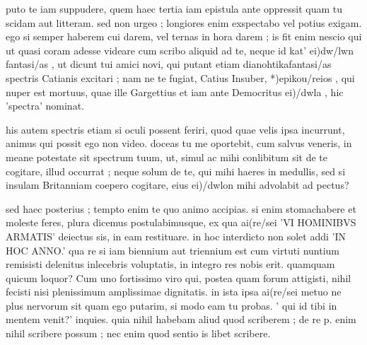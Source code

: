 


 puto te iam suppudere, quem haec tertia iam epistula ante oppressit quam tu scidam aut litteram. sed non urgeo ; longiores enim exspectabo vel potius exigam. ego si semper haberem cui darem, vel ternas in hora darem ; is fit enim nescio qui ut quasi coram adesse videare cum scribo aliquid ad te, neque id kat' ei)dw/lwn fantasi/as , ut dicunt tui amici novi, qui putant etiam dianohtika\s fantasi/as spectris Catianis excitari ; nam ne te fugiat, Catius Insuber, *)epikou/reios , qui nuper est mortuus, quae ille Gargettius et iam ante Democritus ei)/dwla , hic 'spectra' nominat.

 his autem spectris etiam si oculi possent feriri, quod quae velis ipsa incurrunt, animus qui possit ego non video. doceas tu me oportebit, cum salvus veneris, in meane potestate sit spectrum tuum, ut, simul ac mihi conlibitum sit de te cogitare, illud occurrat ; neque solum de te, qui mihi haeres in medullis, sed si insulam Britanniam coepero cogitare, eius ei)/dwlon mihi advolabit ad pectus?

 sed haec posterius ; tempto enim te quo animo accipias. si enim stomachabere et moleste feres, plura dicemus postulabimusque, ex qua ai(re/sei 'VI HOMINIBVS ARMATIS' deiectus sis, in eam restituare. in hoc interdicto non solet addi 'IN HOC ANNO.' qua re si iam biennium aut triennium est cum virtuti nuntium remisisti delenitus inlecebris voluptatis, in integro res nobis erit. quamquam quicum loquor? Cum uno fortissimo viro qui, postea quam forum attigisti, nihil fecisti nisi plenissimum amplissimae dignitatis. in ista ipsa ai(re/sei metuo ne plus nervorum sit quam ego putarim, si modo eam tu probas. ' qui id tibi in mentem venit?' inquies. quia nihil habebam aliud quod scriberem ; de re p. enim nihil scribere possum ; nec enim quod sentio is libet scribere.

